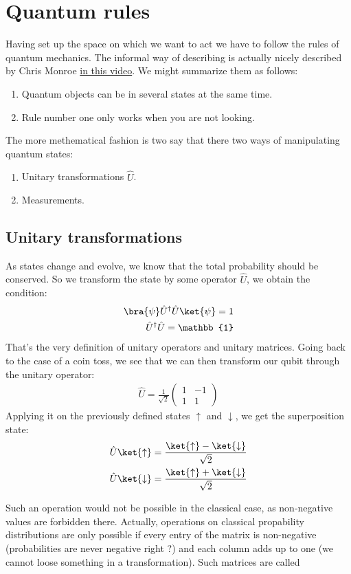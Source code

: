 \section{Quantum rules}
Having set up the space on which we want to act we have to follow the rules of quantum mechanics. The informal way of describing is actually nicely described by Chris Monroe \href{https://youtu.be/CC7nlBM2cSM}{in this video}. We might summarize them as follows:
\begin{enumerate}
\item Quantum objects can be in several states at the same time.
\item Rule number one only works when you are not looking.
\end{enumerate}

The more methematical fashion is two say that there two ways of manipulating quantum states:
\begin{enumerate}
\item Unitary transformations $\hat{U}$.
\item Measurements.
\end{enumerate}

\subsection{Unitary transformations}
As states change and evolve, we know that the total probability should be conserved. So we transform the state by some operator $\hat{U}$, we obtain the condition:
\begin{align}
\bra{\psi}\hat{U}^\dag\hat{U} \ket{\psi} = 1\\
\hat{U}^\dag\hat{U}  = \mathbb{1}
\end{align}
That's the very definition of unitary operators and unitary matrices.
Going back to the case of a coin toss, we see that we can then transform our qubit through the unitary operator:
\begin{align}
\hat{U}=\frac{1}{\sqrt{2}}\left(\begin{array}{cc}
1 & -1\\
1 & 1
\end{array}\right)
\end{align}
Applying it on the previously defined states $\uparrow$ and $\downarrow$, we get the superposition state:
\begin{align}
\hat{U}\ket{\uparrow} &= \frac{\ket{\uparrow}-\ket{\downarrow}}{\sqrt{2}}\\
\hat{U}\ket{\downarrow} &= \frac{\ket{\uparrow}+\ket{\downarrow}}{\sqrt{2}}
\end{align}

Such an operation would not be possible in the classical case, as non-negative values are forbidden there. Actually, operations on classical propability distributions are only possible if every entry of the matrix is non-negative (probabilities are never negative right ?) and each column adds up to one (we cannot loose something in a transformation). Such matrices are called 